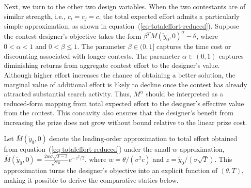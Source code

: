 \documentclass[mnsc]{informs3}
\begin{document}
Next, we turn to the other two design variables.
When the two contestants are of similar strength, i.e., $c_i = c_j = c$, the total expected effort admits a particularly simple approximation, as shown in equation~(\ref{eq-totaleffort-reduced}).
Suppose the contest designer's objective takes the form $\beta^{T}M(\tilde{y}_0,0)^\alpha-\theta$, where $0<\alpha<1$ and $0<\beta\leq 1$.
The parameter $\beta\in(0,1]$ captures the time cost or discounting associated
with longer contests.
The parameter $\alpha\in(0,1)$ captures diminishing returns from aggregate
contest effort to the designer's value.
Although higher effort increases the chance of obtaining a better solution, the marginal value of additional effort is likely to decline once the contest has already attracted substantial search
activity.
Thus, $M^\alpha$ should be interpreted as a reduced-form mapping from total expected effort to the designer's effective value from the contest.
This concavity also ensures that the designer's benefit from increasing the prize does not grow without bound relative to the linear prize cost.


Let $\bar{M}(\tilde y_0,0)$ denote the leading-order approximation to total effort obtained from equation~(\ref{eq-totaleffort-reduced}) under the small-$w$ approximation, $\bar{M}(\tilde y_0,0) = \frac{2w\sigma\sqrt{T-t}}{\sqrt{2\pi}}e^{-z^2/2}$, where $w=\theta/(\sigma^2c)$ and $z=\tilde y_0/(\sigma\sqrt{T})$.
This approximation turns the designer's objective into an explicit function of $(\theta,T)$, making it possible to derive the comparative statics below.
\end{document}
